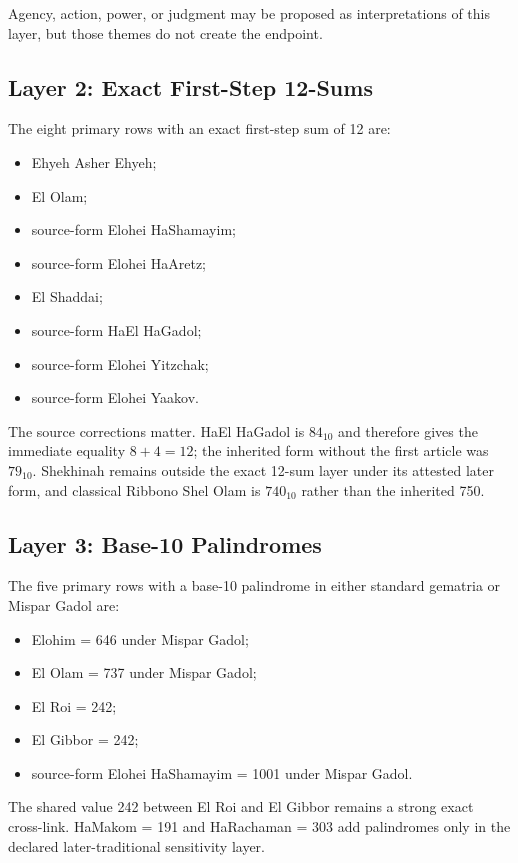 Agency, action, power, or judgment may be proposed as interpretations of this layer, but those themes do not create the endpoint.

\subsection{Layer 2: Exact First-Step 12-Sums}

The eight primary rows with an exact first-step sum of 12 are:

\begin{itemize}
\item Ehyeh Asher Ehyeh;
\item El Olam;
\item source-form Elohei HaShamayim;
\item source-form Elohei HaAretz;
\item El Shaddai;
\item source-form HaEl HaGadol;
\item source-form Elohei Yitzchak;
\item source-form Elohei Yaakov.
\end{itemize}

The source corrections matter. HaEl HaGadol is $84_{10}$ and therefore gives the immediate equality $8+4=12$; the inherited form without the first article was $79_{10}$. Shekhinah remains outside the exact 12-sum layer under its attested later form, and classical Ribbono Shel Olam is $740_{10}$ rather than the inherited 750.

\subsection{Layer 3: Base-10 Palindromes}

The five primary rows with a base-10 palindrome in either standard gematria or Mispar Gadol are:

\begin{itemize}
\item Elohim = 646 under Mispar Gadol;
\item El Olam = 737 under Mispar Gadol;
\item El Roi = 242;
\item El Gibbor = 242;
\item source-form Elohei HaShamayim = 1001 under Mispar Gadol.
\end{itemize}

The shared value 242 between El Roi and El Gibbor remains a strong exact cross-link. HaMakom = 191 and HaRachaman = 303 add palindromes only in the declared later-traditional sensitivity layer.

